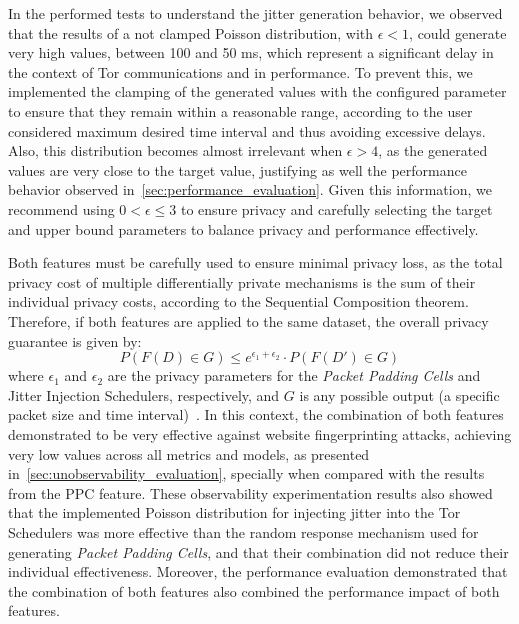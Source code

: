 In the performed tests to understand the jitter generation behavior, we observed that the results of a not clamped Poisson distribution, with $\epsilon < 1$, could generate very high values, between 100 and 50 ms, which represent a significant delay in the context of Tor communications and in performance. To prevent this, we implemented the clamping of the generated values with the configured parameter to ensure that they remain within a reasonable range, according to the user considered maximum desired time interval and thus avoiding excessive delays. Also, this distribution becomes almost irrelevant when $\epsilon > 4$, as the generated values are very close to the target value, justifying as well the performance behavior observed in~\cref{sec:performance_evaluation}.
Given this information, we recommend using $0 < \epsilon \leq 3$ to ensure privacy and carefully selecting the target and upper bound parameters to balance privacy and performance effectively. 


Both features must be carefully used to ensure minimal privacy loss, as the total privacy cost of multiple differentially private mechanisms is the sum of their individual privacy costs, according to the Sequential Composition theorem. Therefore, if both features are applied to the same dataset, the overall privacy guarantee is given by:
\[P(F(D) \in G) \leq e^{\epsilon_1 + \epsilon_2} \cdot P(F(D') \in G)\]
where $\epsilon_1$ and $\epsilon_2$ are the privacy parameters for the \textit{Packet Padding Cells} and Jitter Injection Schedulers, respectively, and $G$ is any possible output (a specific packet size and time interval)~\cite{DP_Book, AlgFoundationsDP}.
In this context, the combination of both features demonstrated to be very effective against website fingerprinting attacks, achieving very low values across all metrics and models, as presented in~\cref{sec:unobservability_evaluation}, specially when compared with the results from the PPC feature.
These observability experimentation results also showed that the implemented Poisson distribution for injecting jitter into the Tor Schedulers was more effective than the random response mechanism used for generating \textit{Packet Padding Cells}, and that their combination did not reduce their individual effectiveness.
Moreover, the performance evaluation demonstrated that the combination of both features also combined the performance impact of both features. 

